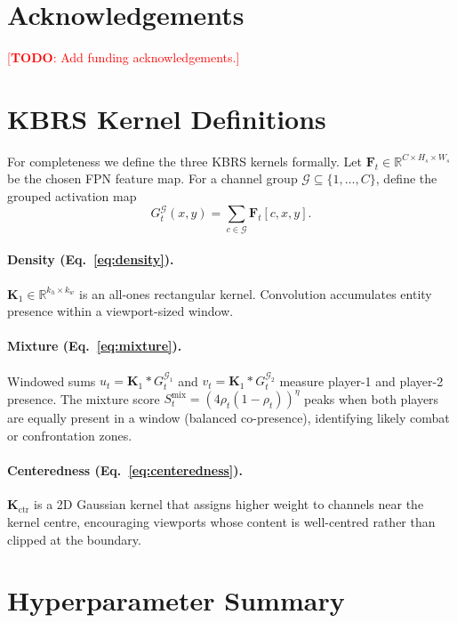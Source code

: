 \documentclass[preprint,12pt]{elsarticle}
\newcommand{\todo}[1]{\textcolor{red}{[\textbf{TODO}: #1]}}
\begin{document}
\section*{Acknowledgements}
\todo{Add funding acknowledgements.}

\appendix

\section{KBRS Kernel Definitions}
\label{app:kbrs_kernels}

For completeness we define the three KBRS kernels formally. Let 
$\mathbf{F}_t \in \mathbb{R}^{C \times H_s \times W_s}$ be the chosen FPN 
feature map. For a channel group $\mathcal{G} \subseteq \{1,\ldots,C\}$, 
define the grouped activation map
\begin{equation}
  G^{\mathcal{G}}_t(x,y) = \sum_{c \in \mathcal{G}} \mathbf{F}_t[c,x,y].
\end{equation}

\paragraph{Density (Eq.~\ref{eq:density}).}
$\mathbf{K}_1 \in \mathbb{R}^{k_h \times k_w}$ is an all-ones rectangular 
kernel. Convolution accumulates entity presence within a viewport-sized 
window.

\paragraph{Mixture (Eq.~\ref{eq:mixture}).}
Windowed sums $u_t = \mathbf{K}_1 * G^{\mathcal{G}_1}_t$ and 
$v_t = \mathbf{K}_1 * G^{\mathcal{G}_2}_t$ measure player-1 and player-2 
presence. The mixture score $S^{\text{mix}}_t = (4\rho_t(1-\rho_t))^\eta$ 
peaks when both players are equally present in a window (balanced 
co-presence), identifying likely combat or confrontation zones.

\paragraph{Centeredness (Eq.~\ref{eq:centeredness}).}
$\mathbf{K}_{\text{ctr}}$ is a 2D Gaussian kernel that assigns higher 
weight to channels near the kernel centre, encouraging viewports whose 
content is well-centred rather than clipped at the boundary.

\section{Hyperparameter Summary}
\label{app:hyperparams}
\end{document}

